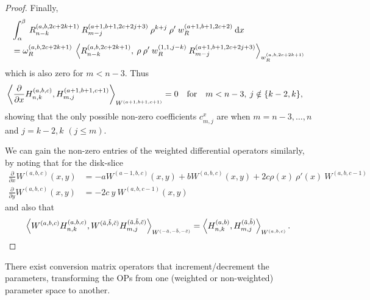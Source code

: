 \documentclass[11pt, oneside]{article}   	%
\newcommand{\pddx}{\frac{\partial}{\partial x}}
\newcommand{\pddy}{\frac{\partial}{\partial y}}
\newcommand{\hdop}{H}
\newcommand{\hdopnkab}{\hdop_{n,k}^{(a,b)}}
\newcommand{\hdopmj}{\hdop_{m,j}}
\newcommand{\genjac}{R}
\newcommand{\genjacnmk}{\genjac_{n-k}}
\newcommand{\genjacmmj}{\genjac_{m-j}}
\newcommand{\genjacw}{w_\genjac}
\newcommand{\normgenjac}{\omega_\genjac}
\newcommand{\hdopnkabc}{\hdop_{n,k}^{(a,b,c)}}
\newcommand{\Wabc}{{W^{(a,b,c)}}}
\begin{document}
\begin{proof}
Finally,
\begin{align*}
	&\int_\alpha^\beta \: \genjacnmk^{(a, b, 2c+2k+1)} \: \genjacmmj^{(a+1, b+1, 2c+2j+3)} \: \rho^{k+j} \: \rho' \: \genjacw^{(a+1, b+1, 2c+2)} \: \D x \\
	&= \normgenjac^{(a, b, 2c+2k+1)} \: \ip< \genjacnmk^{(a, b, 2c+2k+1)}, \: \rho \: \rho' \: \genjacw^{(1, 1, j-k)} \: \genjacmmj^{(a+1, b+1, 2c+2j+3)} >_{\genjacw^{(a, b, 2c+2k+1)}}
\end{align*}
which is also zero for $m < n - 3$. Thus
\begin{align*}
	&\ip<\pddx \hdopnkabc, \hdop^{(a+1, b+1, c+1)}_{m,j} >_{W^{(a+1, b+1, c+1)}} = 0 \qfor m < n - 3, \: j \notin \{k-2, k\},
\end{align*}
showing that the only possible non-zero coefficients $c_{m,j}^x$ are when $m = n-3,\dots,n$ and $j = k-2,k$ $(j \le m)$.

We can gain the non-zero entries of the weighted differential operators similarly, by noting that for the disk-slice
\begin{align}
	\pddx \Wabc(x,y) &= -a W^{(a-1, b, c)}(x,y) + bW^{(a, b, c)}(x,y) + 2c \rho(x) \: \rho'(x) \: W^{(a, b, c-1)} \label{eqn:weightderivativex} \\
	\pddy \Wabc(x,y) &= -2c \: y \: W^{(a, b, c-1)}(x,y) \label{eqn:weightderivativey}
\end{align}
and also that
\begin{align*}
	\ip< \Wabc \hdopnkabc, W^{(\tilde{a},\tilde{b},\tilde{c})} \hdopmj^{(\tilde{a},\tilde{b},\tilde{c})} >_{W^{(-\tilde{a},-\tilde{b},-\tilde{c})}} = \ip< \hdopnkab, \hdopmj^{(\tilde{a},\tilde{b})} >_\Wabc.
\end{align*}

\end{proof}

There exist conversion matrix operators that increment/decrement the parameters, transforming the OPs from one (weighted or non-weighted) parameter space to another. 
\end{document}
